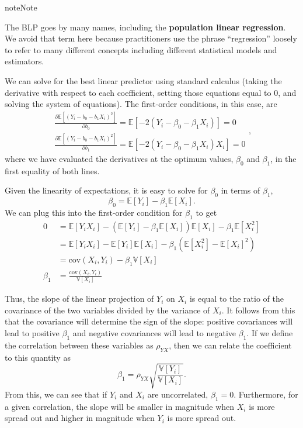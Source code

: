 \documentclass[
  13pt,
  letterpaper,
  DIV=11,
  numbers=noendperiod]{scrreprt}
\newcommand{\E}{\mathbb{E}}
\newcommand{\V}{\mathbb{V}}
\newcommand{\cov}{\text{cov}}
\theoremstyle{plain}
\theoremstyle{plain}
\theoremstyle{definition}
\theoremstyle{definition}
\theoremstyle{remark}
\begin{document}
\begin{bookcallout}{note}{Note}

The BLP goes by many names, including the \textbf{population linear
regression}. We avoid that term here because practitioners use the
phrase ``regression'' loosely to refer to many different concepts
including different statistical models and estimators.

\end{bookcallout}

We can solve for the best linear predictor using standard calculus
(taking the derivative with respect to each coefficient, setting those
equations equal to 0, and solving the system of equations). The
first-order conditions, in this case, are \[ 
\begin{aligned}
  \frac{\partial \E[(Y_{i} - b_{0} - b_{1}X_{i} )^{2}]}{\partial b_{0}} = \E[-2(Y_{i} - \beta_{0} - \beta_{1}X_{i})] = 0 \\
  \frac{\partial \E[(Y_{i} - b_{0} - b_{1}X_{i} )^{2}]}{\partial b_{1}} = \E[-2(Y_{i} - \beta_{0} - \beta_{1}X_{i})X_{i}] = 0
\end{aligned},
\] where we have evaluated the derivatives at the optimum values,
\(\beta_0\) and \(\beta_1\), in the first equality of both lines.

Given the linearity of expectations, it is easy to solve for \(\beta_0\)
in terms of \(\beta_1\), \[ 
\beta_{0} = \E[Y_{i}] - \beta_{1}\E[X_{i}].
\] We can plug this into the first-order condition for \(\beta_1\) to
get \[ 
\begin{aligned}
  0 &= \E[Y_{i}X_{i}] - (\E[Y_{i}] - \beta_{1}\E[X_{i}])\E[X_{i}] - \beta_{1}\E[X_{i}^{2}] \\
    &= \E[Y_{i}X_{i}] - \E[Y_{i}]\E[X_{i}] - \beta_{1}(\E[X_{i}^{2}] - \E[X_{i}]^{2}) \\
    &= \cov(X_{i},Y_{i}) - \beta_{1}\V[X_{i}]\\
  \beta_{1} &= \frac{\cov(X_{i},Y_{i})}{\V[X_{i}]}
\end{aligned}
\]

Thus, the slope of the linear projection of \(Y_i\) on \(X_i\) is equal
to the ratio of the covariance of the two variables divided by the
variance of \(X_i\). It follows from this that the covariance will
determine the sign of the slope: positive covariances will lead to
positive \(\beta_1\) and negative covariances will lead to negative
\(\beta_1\). If we define the correlation between these variables as
\(\rho_{YX}\), then we can relate the coefficient to this quantity as \[
\beta_1 = \rho_{YX}\sqrt{\frac{\V[Y_i]}{\V[X_i]}}.
\] From this, we can see that if \(Y_i\) and \(X_i\) are uncorrelated,
\(\beta_1 = 0\). Furthermore, for a given correlation, the slope will be
smaller in magnitude when \(X_i\) is more spread out and higher in
magnitude when \(Y_i\) is more spread out.
\end{document}
